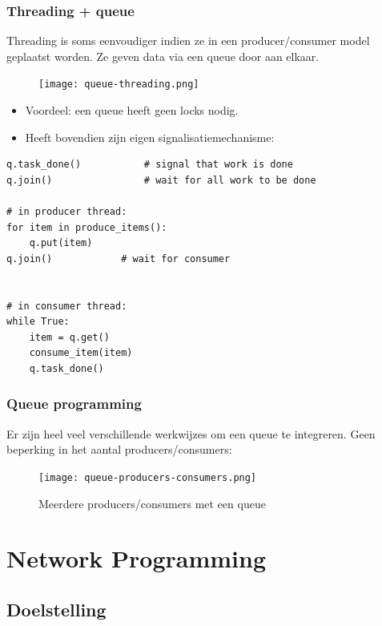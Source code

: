 \documentclass{article}
\begin{document}
\subsubsection{Threading + queue}

Threading is soms eenvoudiger indien ze in een producer/consumer model geplaatst worden.
Ze geven data via een queue door aan elkaar.

\begin{figure}[H]
    \centering
    \texttt{[image: queue-threading.png]}
\end{figure}

\begin{itemize}
    \item Voordeel: een queue heeft geen locks nodig. 
    \item Heeft bovendien zijn eigen signalisatiemechanisme:
\end{itemize}

\begin{verbatim}
q.task_done()           # signal that work is done
q.join()                # wait for all work to be done

# in producer thread:
for item in produce_items():
    q.put(item)
q.join()            # wait for consumer


# in consumer thread:
while True:
    item = q.get()
    consume_item(item)
    q.task_done()
\end{verbatim}


\subsubsection{Queue programming}

Er zijn heel veel verschillende werkwijzes om een queue te integreren.
Geen beperking in het aantal producers/consumers:

\begin{figure}[H]
    \centering
    \texttt{[image: queue-producers-consumers.png]}
    \caption{Meerdere producers/consumers met een queue}
\end{figure}

\section{Network Programming}

\subsection{Doelstelling}
\end{document}
